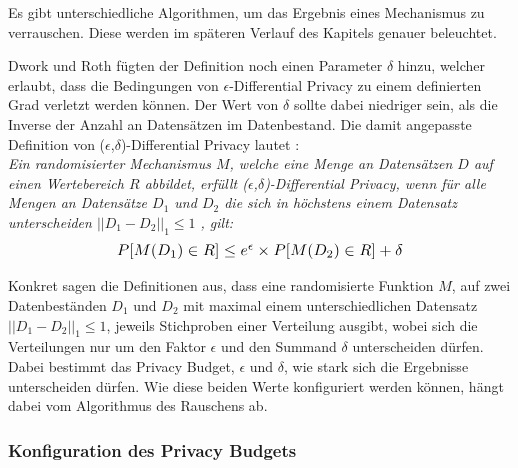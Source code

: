 Es gibt unterschiedliche Algorithmen, um das Ergebnis eines Mechanismus zu verrauschen.
Diese werden im späteren Verlauf des Kapitels genauer beleuchtet.

Dwork und Roth \cite{P-27} fügten der Definition noch einen Parameter $\delta$ hinzu, welcher erlaubt, dass die Bedingungen von $\epsilon$-Differential Privacy zu einem definierten Grad verletzt werden können.
Der Wert von $\delta$ sollte dabei niedriger sein, als die Inverse der Anzahl an Datensätzen im Datenbestand.
Die damit angepasste Definition von ($\epsilon$,$\delta$)-Differential Privacy lautet \cite{P-27}:\\
\textit{
Ein randomisierter Mechanismus $M$, welche eine Menge an Datensätzen $D$ auf einen Wertebereich $R$ abbildet, erfüllt ($\epsilon$,$\delta$)-Differential Privacy, wenn für alle Mengen an Datensätze $D_{1}$ und $D_{2}$ die sich in höchstens einem Datensatz unterscheiden $||D_{1} - D_{2}||_{1} \leq 1$ , gilt:}
\begin{equation}
\resizebox{!}{0.3cm}{$
    P[M(D_{1}) \in R] \leq e^{\epsilon} \times P[M(D_{2}) \in R] + \delta
$}
\end{equation} 

Konkret sagen die Definitionen aus, dass eine randomisierte Funktion $M$, auf zwei Datenbeständen $D_{1}$ und $D_{2}$ mit maximal einem unterschiedlichen Datensatz $||D_{1} - D_{2}||_{1} \leq 1$, jeweils Stichproben einer Verteilung ausgibt, wobei sich die Verteilungen nur um den Faktor $\epsilon$ und den Summand $\delta$ unterscheiden dürfen.
Dabei bestimmt das Privacy Budget, $\epsilon$ und $\delta$, wie stark sich die Ergebnisse unterscheiden dürfen.
Wie diese beiden Werte konfiguriert werden können, hängt dabei vom Algorithmus des Rauschens ab.

\subsubsection*{Konfiguration des Privacy Budgets}

